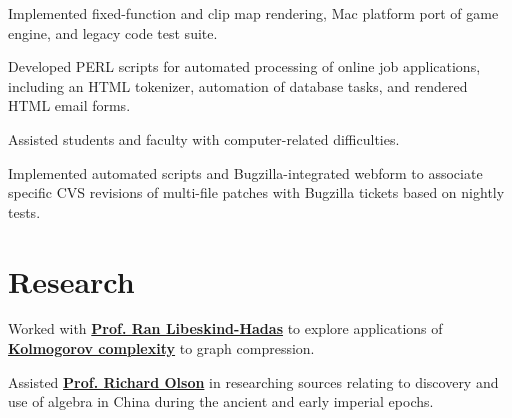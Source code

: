 \documentclass[]{jhearn-resume}
\begin{document}
\begin{minipage}[t]{0.64\textwidth}
\begin{tightemize}
\item Implemented fixed-function and clip map rendering, Mac platform port of game engine, and legacy code test suite.
\end{tightemize}
\sectionsep

\begin{tightemize}
\item Developed PERL scripts for automated processing of online job applications, including an HTML tokenizer, automation of database tasks, and rendered HTML email forms.
\item Assisted students and faculty with computer-related difficulties.
\end{tightemize}
\sectionsep

\begin{tightemize}
\item Implemented automated scripts and Bugzilla-integrated webform to
associate specific CVS revisions of multi-file patches with Bugzilla tickets based on nightly tests.
\end{tightemize}
\sectionsep

\section{Research}
\begin{tightemize}
\item Worked with \textbf{\href{https://www.cs.hmc.edu/~hadas/}{Prof. Ran Libeskind-Hadas}} to explore applications of \textbf{\href{https://en.wikipedia.org/wiki/Kolmogorov_complexity}{Kolmogorov complexity}} to graph compression.
\end{tightemize}
\sectionsep 

\begin{tightemize}
\item Assisted \textbf{\href{https://www.hmc.edu/hsa/hsa-faculty/emeritus-faculty/richard-olson/}{Prof. Richard Olson}} in researching sources relating to discovery and use of algebra in China during the ancient and early imperial epochs.
\end{tightemize}
\sectionsep

\end{minipage}
\end{document}
